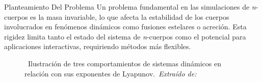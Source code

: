 \begin{frame}{Planteamiento Del Problema}%
    \vspace{-0.15cm}
    {\fontsize{8pt}{10pt}\selectfont
    Un problema fundamental en las simulaciones de \textit{n}-cuerpos es la masa invariable, lo que afecta la estabilidad de los cuerpos involucrados en fenómenos dinámicos como fusiones estelares o acreción. Esta rigidez limita tanto el estado del sistema de \textit{n}-cuerpos como el potencial para aplicaciones interactivas, requiriendo métodos más flexibles.}
    \vspace{0cm}
    \begin{figure}[H]
        \centering
        \href{https://github.com/ThomasSavary08/Lyapynov/tree/main}{%
        }
        \vspace{-0.25cm}
        \caption{\tiny~Ilustración de tres comportamientos de sistemas dinámicos en relación con sus exponentes de Lyapunov.~\textit{Extraído de:}~\cite{wang_numerical_methods_2014}}%
        \label{fig:neutron_star_merger}
    \end{figure}
\end{frame}

